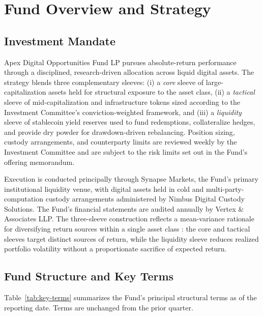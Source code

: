 \section{Fund Overview and Strategy}

\subsection{Investment Mandate}

Apex Digital Opportunities Fund LP pursues absolute-return performance through a disciplined, research-driven allocation across liquid digital assets. The strategy blends three complementary sleeves: (i) a \textit{core} sleeve of large-capitalization assets held for structural exposure to the asset class, (ii) a \textit{tactical} sleeve of mid-capitalization and infrastructure tokens sized according to the Investment Committee's conviction-weighted framework, and (iii) a \textit{liquidity} sleeve of stablecoin yield reserves used to fund redemptions, collateralize hedges, and provide dry powder for drawdown-driven rebalancing. Position sizing, custody arrangements, and counterparty limits are reviewed weekly by the Investment Committee and are subject to the risk limits set out in the Fund's offering memorandum.

Execution is conducted principally through Synapse Markets, the Fund's primary institutional liquidity venue, with digital assets held in cold and multi-party-computation custody arrangements administered by Nimbus Digital Custody Solutions. The Fund's financial statements are audited annually by Vertex \& Associates LLP. The three-sleeve construction reflects a mean-variance rationale for diversifying return sources within a single asset class \citep{markowitz1952}: the core and tactical sleeves target distinct sources of return, while the liquidity sleeve reduces realized portfolio volatility without a proportionate sacrifice of expected return.

\subsection{Fund Structure and Key Terms}

Table~\ref{tab:key-terms} summarizes the Fund's principal structural terms as of the reporting date. Terms are unchanged from the prior quarter.

